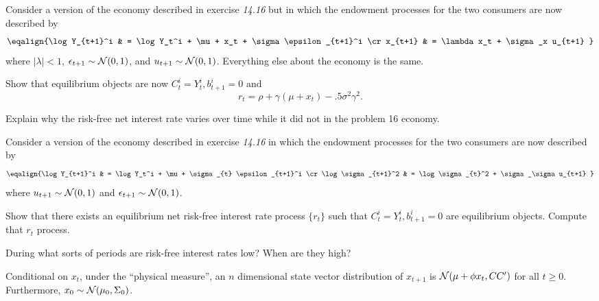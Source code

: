 \medskip

 

\medskip
\noindent Consider a version of the economy described in exercise {\it 14.16} %
but in which the endowment processes for the two consumers are now described
by
$$ \eqalign{\log Y_{t+1}^i  & = \log Y_t^i + \mu + x_t + \sigma \epsilon_{t+1}^i \cr
             x_{t+1} & = \lambda x_t + \sigma_x u_{t+1} } $$
where $|\lambda | < 1$, $\epsilon_{t+1} \sim {\cal N}(0,1)$,  and $u_{t+1} \sim {\cal N}(0,1)$.
Everything else about the economy is the same.

\medskip

  Show that equilibrium objects are now $C_t^i = Y^i_t, b^i_{t+1} = 0$ and
 $$ r_t = \rho +\gamma (\mu + x_t) - .5 \sigma^2 \gamma^2 .$$

\medskip

  Explain why the risk-free net interest rate varies over time while it did not in the problem 16 economy.


\medskip

 

\medskip

\noindent Consider a version of the economy described in exercise {\it 14.16} in which the endowment processes for the two consumers are now described by
$$ \eqalign{\log Y_{t+1}^i  & = \log Y_t^i + \mu + \sigma_{t} \epsilon_{t+1}^i \cr
             \log \sigma_{t+1}^2 & = \log \sigma_{t}^2 + \sigma_\sigma u_{t+1} } $$
where  $u_{t+1} \sim {\cal N}(0,1)$ and $\epsilon_{t+1} \sim {\cal N}(0,1)$.

\medskip

 Show that there exists an equilibrium net risk-free interest rate process  $\{r_t\}$ such that $C_t^i = Y^i_t, b^i_{t+1} = 0$ are equilibrium objects.
Compute that $r_t$ process.

\medskip
{} During what sorts of periods are risk-free interest rates low? When are they high?



 \quad {}
\medskip
\noindent Conditional on $x_t$, under the ``physical measure'', an $n$ dimensional state vector  distribution of $x_{t+1}$
is ${\cal N}(\mu + \phi x_t, CC')$ for all $t \geq 0$. Furthermore, $x_0 \sim {\cal N}(\mu_0, \Sigma_0)$.

